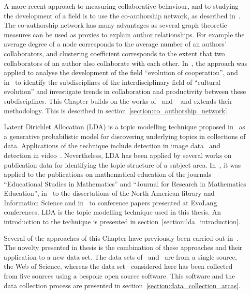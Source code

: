 A more recent approach to measuring collaborative behaviour, and to studying the
development of a field is to use the co-authorship network, as described
in~\cite{Liu2015}. The co-authorship network has many advantages as several
graph theoretic measures can be used as proxies to explain author relationships.
For example the average degree of a node corresponds to the average number of
an authors' collaborators, and clustering coefficient corresponds to the extent that
two collaborators of an author also collaborate with each other.
In~\cite{Liu2015}, the approach was applied to analyse the development of the field
``evolution of cooperation'', and in~\cite{youngblood2018} to identify the
subdisciplines of the interdisciplinary field of ``cultural evolution'' and
investigate trends in collaboration and productivity between these subdisciplines.
This Chapter builds on the works of~\cite{Liu2015} and ~\cite{youngblood2018} 
and extends their methodology. This is described in
section~\ref{section:co_authorship_network}.

Latent Dirichlet Allocation (LDA) is a topic modelling technique proposed
in~\cite{Blei2003} as a generative probabilistic model for discovering
underlying topics in collections of data.
Applications of the technique include detection in image data~\cite{Agarwal2008,
Coelho2010} and detection in video~\cite{Niebles2008, Wang2008}. Nevertheless,
LDA has been applied by several works on publication data for identifying the
topic structure of a subject area. In~\cite{Inglis2018}, it was applied to the
publications on mathematical education of the journals ``Educational Studies in
Mathematics'' and ``Journal for Research in Mathematics Education'', in~\cite{Sugimoto2011}
to the dissertations of the North American library and Information Science and
in~\cite{Bergmann2018} to conference papers presented at EvoLang conferences.
LDA is the topic modelling technique used in this thesis. An introduction to
the technique is presented in section~\ref{section:lda_introduction}.

Several of the approaches of this Chapter have previously been carried
out in~\cite{Bergmann2018,Liu2015,Sugimoto2011, youngblood2018}. The novelty presented in
thesis is the combination of these approaches and their application to a new data
set. The data sets of~\cite{Liu2015} and~\cite{youngblood2018} are from 
 a single source, the Web of Science, whereas the data set~\cite{pd_data_2018}
considered here has been collected from five sources using a bespoke open source
software. This software and the data collection process are presented in
section~\ref{section:data_collection_arcas}.

